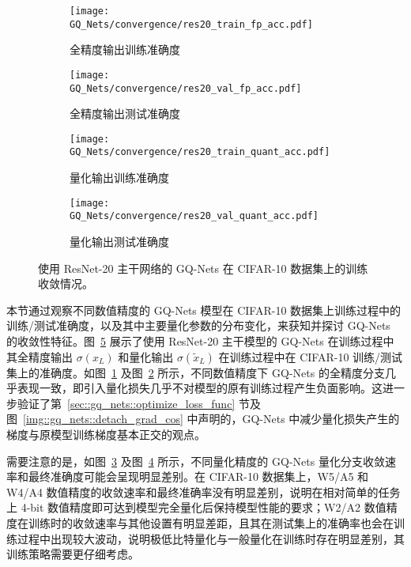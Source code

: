 \begin{figure}[htb]
  \centering
  \begin{subfigure}[t]{0.45\columnwidth}
    \centering
    \texttt{[image: GQ\_Nets/convergence/res20\_train\_fp\_acc.pdf]}
    \caption{全精度输出训练准确度}
    \label{img::gq_nets::res20_train_fp_acc}
  \end{subfigure}
  \quad
  \begin{subfigure}[t]{0.45\columnwidth}
    \centering
    \texttt{[image: GQ\_Nets/convergence/res20\_val\_fp\_acc.pdf]}
    \caption{全精度输出测试准确度}
    \label{img::gq_nets::res20_eval_fp_acc}
  \end{subfigure}
  \newline
  \vspace*{0.5 cm}
  \newline
  \begin{subfigure}[t]{0.45\columnwidth}
    \centering
    \texttt{[image: GQ\_Nets/convergence/res20\_train\_quant\_acc.pdf]}
    \caption{量化输出训练准确度}
    \label{img::gq_nets::res20_train_quant_acc}
  \end{subfigure}
  \quad
  \begin{subfigure}[t]{0.45\columnwidth}
    \centering
    \texttt{[image: GQ\_Nets/convergence/res20\_val\_quant\_acc.pdf]}
    \caption{量化输出测试准确度}
    \label{img::gq_nets::res20_eval_quant_acc}
  \end{subfigure}
  \caption{使用 ResNet-20 主干网络的 GQ-Nets 在 CIFAR-10 数据集上的训练收敛情况。}
  \label{img::gq_nets::res20_convergence}
\end{figure}

本节通过观察不同数值精度的 GQ-Nets 模型在 CIFAR-10 数据集上训练过程中的训练/测试准确度，以及其中主要量化参数的分布变化，来获知并探讨 GQ-Nets 的收敛性特征。图~\ref{img::gq_nets::res20_convergence} 展示了使用 ResNet-20 主干模型的 GQ-Nets 在训练过程中其全精度输出 $\sigma(x_L)$ 和量化输出 $\sigma(\tilde{x}_L)$ 在训练过程中在 CIFAR-10 训练/测试集上的准确度。如图~\ref{img::gq_nets::res20_train_fp_acc} 及图~\ref{img::gq_nets::res20_eval_fp_acc} 所示，不同数值精度下 GQ-Nets 的全精度分支几乎表现一致，即引入量化损失几乎不对模型的原有训练过程产生负面影响。这进一步验证了第~\ref{sec::gq_nets::optimize_loss_func} 节及图~\ref{img::gq_nets::detach_grad_cos} 中声明的，GQ-Nets 中减少量化损失产生的梯度与原模型训练梯度基本正交的观点。

需要注意的是，如图~\ref{img::gq_nets::res20_train_quant_acc} 及图~\ref{img::gq_nets::res20_eval_quant_acc} 所示，不同量化精度的 GQ-Nets 量化分支收敛速率和最终准确度可能会呈现明显差别。在 CIFAR-10 数据集上，W5/A5 和 W4/A4 数值精度的收敛速率和最终准确率没有明显差别，说明在相对简单的任务上 4-bit 数值精度即可达到模型完全量化后保持模型性能的要求；W2/A2 数值精度在训练时的收敛速率与其他设置有明显差距，且其在测试集上的准确率也会在训练过程中出现较大波动，说明极低比特量化与一般量化在训练时存在明显差别，其训练策略需要更仔细考虑。

